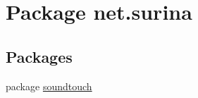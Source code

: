\hypertarget{namespacenet_1_1surina}{}\section{Package net.\+surina}
\label{namespacenet_1_1surina}
\subsection*{Packages}
\begin{DoxyCompactItemize}
\item 
package \hyperlink{namespacenet_1_1surina_1_1soundtouch}{soundtouch}
\end{DoxyCompactItemize}
